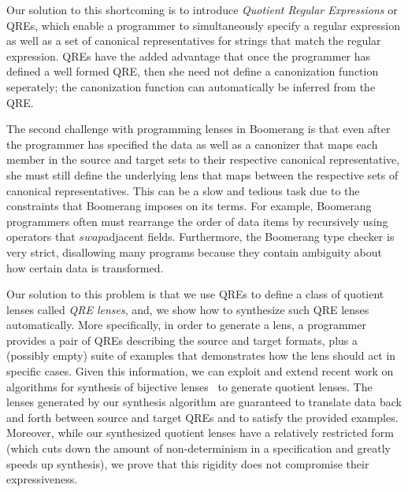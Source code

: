 \documentclass[acmsmall,review,anonymous]{acmart}
\newcommand{\kw}[1]{\ensuremath{\mathit{#1}}}
\newcommand{\swap}{\ensuremath{\kw{swap}}}
\begin{document}
Our solution to this shortcoming is to introduce {\em Quotient Regular
Expressions} or QREs, which enable a programmer to simultaneously specify a
regular expression as well as a set of canonical representatives for strings
that match the regular expression. QREs have the added advantage that once the
programmer has defined a well formed QRE, then she need not define a
canonization function seperately; the canonization function can automatically be
inferred from the QRE.

The second challenge with programming lenses in Boomerang is that even after the
programmer has specified the data as well as a canonizer that maps each member
in the source and target sets to their respective canonical representative, she
must still define the underlying lens that maps between the respective sets of
canonical representatives. This can be a slow and tedious task due to the
constraints that Boomerang imposes on its terms. For example, Boomerang
programmers often must rearrange the order of data items by recursively using
operators that \swap adjacent fields. Furthermore, the Boomerang type checker is
very strict, disallowing many programs because they contain ambiguity about how
certain data is transformed.

Our solution to this problem is that we use QREs to define a class of quotient
lenses called {\em QRE lenses}, and, we show how to synthesize such QRE lenses
automatically. More specifically, in order to generate a lens, a programmer
provides a pair of QREs describing the source and target formats, plus
a (possibly empty) suite of examples that demonstrates how the
lens should act in specific cases.  Given this information, we can exploit and
extend recent work on algorithms for synthesis of bijective
lenses~\cite{optician} to generate quotient lenses. The lenses generated by
our synthesis algorithm are guaranteed to translate data back and forth
between source and target QREs and to satisfy the provided examples.
Moreover, while our synthesized quotient lenses have a relatively
restricted form (which cuts down the amount of non-determinism in
a specification and greatly speeds up synthesis), we prove that
this rigidity does not compromise their expressiveness.
\end{document}
